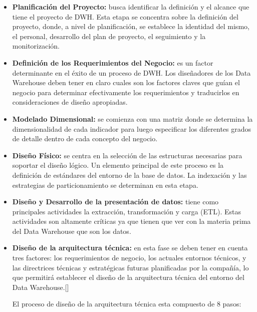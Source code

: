 \documentclass[11pt,a4paper]{article}
\begin{document}
		\begin{itemize}
			\item \textbf{Planificación del Proyecto:}  busca identificar la definición y el alcance que tiene el proyecto de DWH. Esta etapa se concentra sobre la definición del proyecto, donde, a nivel de planificación, se establece la identidad del mismo, el personal, desarrollo del plan de proyecto, el seguimiento y la monitorización.
			
			\item \textbf{Definición de los Requerimientos del Negocio:} es un factor determinante en el éxito de un proceso de DWH. Los diseñadores de los Data Warehouse deben tener en claro cuales son los factores claves que guían el negocio para determinar efectivamente los requerimientos y traducirlos en consideraciones de diseño apropiadas.
			
			\item \textbf{Modelado Dimensional:} se comienza con una matriz donde se determina la dimensionalidad de cada indicador para luego especificar los diferentes grados de detalle dentro de cada concepto del negocio.
			
			\item \textbf{Diseño Físico:} se centra en la selección de las estructuras necesarias para soportar el diseño lógico. Un elemento principal de este proceso es la definición de estándares del entorno de la base de datos. La indexación y las estrategias de particionamiento se determinan en esta etapa.
			
			\item \textbf{Diseño y Desarrollo de la presentación de datos:} tiene como principales actividades la extracción, transformación y carga (ETL). Estas actividades son altamente críticas ya que tienen que ver con la materia prima del Data Warehouse que son los datos.
			
			\item \textbf{Diseño de la arquitectura técnica:} en esta fase se deben tener en cuenta tres factores: los requerimientos de negocio, los actuales entornos técnicos, y las directrices técnicas y estratégicas futuras planificadas por la compañía, lo que permitirá establecer el diseño de la arquitectura técnica del entorno del Data Warehouse.[\cite{metodKimball2}]
			
			El proceso de diseño de la arquitectura técnica esta compuesto de 8 pasos:
			

\end{itemize}
\end{document}
